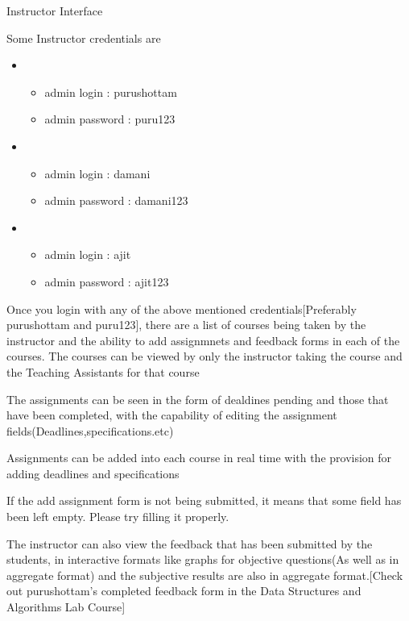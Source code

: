 \documentclass[11pt]{report}
\begin{document}
\newpage
\begin{outline}
	\item Instructor Interface
    \begin{outline}
    	\item Some Instructor credentials are 
    		\begin{itemize}
    			\item
    		\begin{itemize}
    			\item admin login : purushottam
				\item admin password : puru123
    		\end{itemize}
    		\item
    		\begin{itemize}
    			\item admin login : damani	
				\item admin password :	damani123
    		\end{itemize}
    		\item
    		\begin{itemize}
    			\item admin login : ajit	
				\item admin password :	ajit123
    		\end{itemize}
    		\end{itemize}
    	\item Once you login with any of the above mentioned credentials[Preferably purushottam and puru123], there are a list of courses being taken by the instructor and the ability to add assignmnets and feedback forms in each of the courses. The courses can be viewed by only the instructor taking the course and the Teaching Assistants for that course
    	\item The assignments can be seen in the form of dealdines pending and those that have been completed, with the capability of editing the assignment fields(Deadlines,specifications.etc)
    	\item Assignments can be added into each course in real time with the provision for adding deadlines and specifications
		\item If the add assignment form is not being submitted, it means that some field has been left empty. Please try filling it properly.
		\item The instructor can also view the feedback that has been submitted by the students, in interactive formats like graphs for objective questions(As well as in aggregate format) and the subjective results are also in aggregate format.[Check out purushottam's completed feedback form in the Data Structures and Algorithms Lab Course]

\end{outline}
\end{outline}
\end{document}
